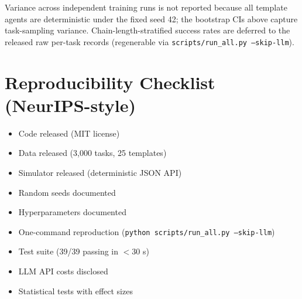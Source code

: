 \documentclass[10pt]{article}
\begin{document}
Variance across independent training runs is not reported because all template agents are deterministic under the fixed seed 42; the bootstrap CIs above capture task-sampling variance. Chain-length-stratified success rates are deferred to the released raw per-task records (regenerable via \texttt{scripts/run\_all.py --skip-llm}).

\section{Reproducibility Checklist (NeurIPS-style)}

\begin{itemize}
    \item[\checkmark] Code released (MIT license)
    \item[\checkmark] Data released (3{,}000 tasks, 25 templates)
    \item[\checkmark] Simulator released (deterministic JSON API)
    \item[\checkmark] Random seeds documented
    \item[\checkmark] Hyperparameters documented
    \item[\checkmark] One-command reproduction (\texttt{python scripts/run\_all.py --skip-llm})
    \item[\checkmark] Test suite (39/39 passing in $<$30 s)
    \item[\checkmark] LLM API costs disclosed
    \item[\checkmark] Statistical tests with effect sizes
\end{itemize}
\end{document}
